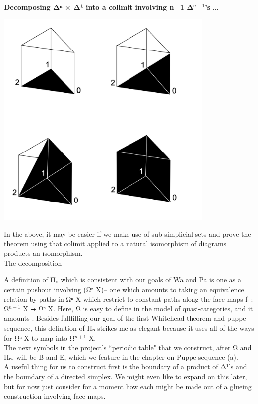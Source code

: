 \documentclass{book}
\theoremstyle{definition}
\begin{document}
{\bf Decomposing Δⁿ × Δ¹ into a colimit involving n+1 Δ${}^{n+1}$'s} ...

\begin{center}
\includegraphics[width=300pt]{prismfilling.png}
\end{center}

In the above, it may be easier if we make use of sub-simplicial sets and prove the theorem using that colimit applied to a natural isomorphism of diagrams products an isomorphism.\\

The decomposition 

A definition of Π⃗ₙ which is consistent with our goals of Wa and Pa is one as a certain pushout involving (Ω⃗ⁿ X)-- one which amounts to taking an equivalence relation by paths in Ω⃗ⁿ X which restrict to constant paths along the face maps fᵢ : Ω⃗${}^{n-1}$ X ⭢ Ω⃗ⁿ X. Here, Ω⃗ is easy to define in the model of quasi-categories, and it amounts . Besides fullfilling our goal of the first Whitehead theorem and puppe sequence, this definition of Π⃗ₙ strikes me as elegant because it uses all of the ways for Ω⃗ⁿ X to map into Ω⃗${}^{n+1}$ X.\\

The next symbols in the project's ``periodic table" that we construct, after Ω⃗ and Π⃗ₙ, will be B⃗ and E⃗, which we feature in the chapter on Puppe sequence (a).\\

A useful thing for us to construct first is the boundary of a product of Δ¹'s and the boundary of a directed simplex. We might even like to expand on this later, but for now just consider for a moment how each might be made out of a glueing construction involving face maps.\\
\end{document}
